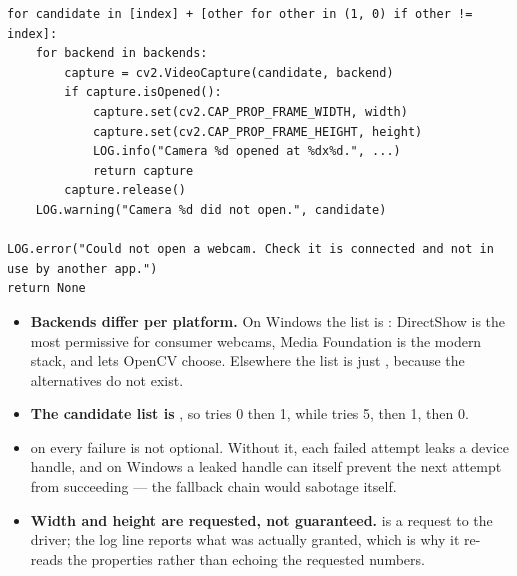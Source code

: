 \begin{codecard}
\begin{lstlisting}
for candidate in [index] + [other for other in (1, 0) if other != index]:
    for backend in backends:
        capture = cv2.VideoCapture(candidate, backend)
        if capture.isOpened():
            capture.set(cv2.CAP_PROP_FRAME_WIDTH, width)
            capture.set(cv2.CAP_PROP_FRAME_HEIGHT, height)
            LOG.info("Camera %d opened at %dx%d.", ...)
            return capture
        capture.release()
    LOG.warning("Camera %d did not open.", candidate)

LOG.error("Could not open a webcam. Check it is connected and not in use by another app.")
return None
\end{lstlisting}
\end{codecard}

\begin{itemize}
  \item \textbf{Backends differ per platform.} On Windows the list is
        : DirectShow is the most permissive for consumer
        webcams, Media Foundation is the modern stack, and  lets OpenCV choose.
        Elsewhere the list is just , because the alternatives do not exist.
  \item \textbf{The candidate list is} ,
        so  tries 0 then 1, while  tries 5, then 1, then 0.
  \item {} on every failure is not optional. Without it, each failed attempt
        leaks a device handle, and on Windows a leaked handle can itself prevent the next attempt
        from succeeding --- the fallback chain would sabotage itself.
  \item \textbf{Width and height are requested, not guaranteed.}  is a request to the
        driver; the log line reports what was actually granted, which is why it re-reads the
        properties rather than echoing the requested numbers.
\end{itemize}

